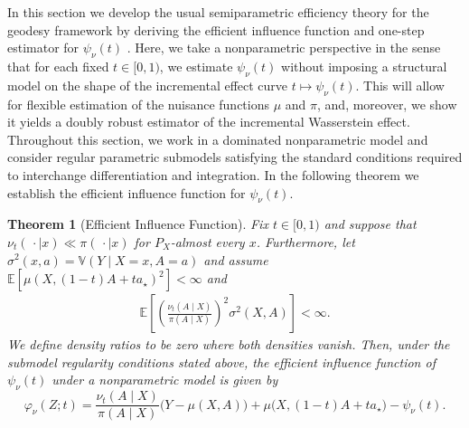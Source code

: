 \documentclass[11pt,twoside]{article}
\newtheorem{theorem}{Theorem}
\theoremstyle{definition}
\theoremstyle{remark}
\begin{document}
In this section we develop the usual semiparametric efficiency theory for the geodesy framework by deriving the efficient influence function and one-step estimator for $\psi_\nu(t)$ \citep{bickel1998efficient, Chernozhukov2018, kennedy2024semiparametric}. Here, we take a nonparametric perspective in the sense that for each fixed $t\in[0,1)$, we estimate $\psi_\nu(t)$ without imposing a structural model on the shape of the incremental effect curve $t\mapsto\psi_\nu(t)$. This will allow for flexible estimation of the nuisance functions $\mu$ and $\pi$, and, moreover, we show it yields a doubly robust estimator of the incremental Wasserstein effect. Throughout this section, we work in a dominated nonparametric model and consider regular parametric submodels satisfying the standard conditions required to interchange differentiation and integration. In the following theorem we establish the efficient influence function for $\psi_\nu(t)$. 

\begin{theorem}[Efficient Influence Function] \label{eif_theorem}
Fix $t\in[0,1)$ and suppose that $\nu_t(\,\cdot\mid x)\ll\pi(\,\cdot\mid x)$ for $P_X$-almost every $x$. Furthermore, let $\sigma^2(x,a)=\mathbb{V}(Y\mid X=x,A=a)$ and assume $\mathbb{E}\!\left[ \mu(X, (1-t)A+ta_\star)^{2} \right]<\infty$ and
\begin{align*}
    \mathbb{E}\!\left[\left(\frac{\nu_t(A\mid X)}{\pi(A\mid X)}\right)^{2} \sigma^2(X,A) \right]<\infty.
\end{align*}
We define density ratios to be zero where both densities vanish. Then, under the submodel regularity conditions stated above, the efficient influence function of $\psi_\nu(t)$ under a nonparametric model is given by
\begin{equation}\label{eq::if}
\varphi_\nu(Z; t) =  \frac{\nu_t(A \mid X)}{\pi(A \mid X)}\big(Y - \mu(X, A) \big) +  \mu\big(X, (1 - t)A + t a_{\star}\big) - \psi_\nu(t).
\end{equation}
\end{theorem}
\end{document}
